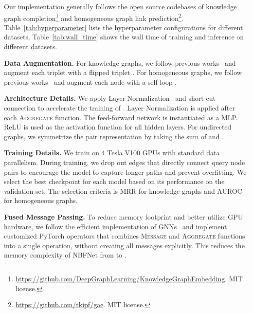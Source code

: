 Our implementation generally follows the open source codebases of knowledge graph completion\footnote{\url{https://github.com/DeepGraphLearning/KnowledgeGraphEmbedding}. MIT license.} and homogeneous graph link prediction\footnote{\url{https://github.com/tkipf/gae}. MIT license.}. Table~\ref{tab:hyperparameter} lists the hyperparameter configurations for different datasets. Table~\ref{tab:wall_time} shows the wall time of training and inference on different datasets.

\textbf{Data Augmentation.} For knowledge graphs, we follow previous works~\cite{yang2017differentiable, sadeghian2019drum} and augment each triplet  with a flipped triplet . For homogeneous graphs, we follow previous works~\cite{kipf2016semi, kipf2016variational} and augment each node  with a self loop .

\textbf{Architecture Details.} We apply Layer Normalization~\cite{ba2016layer} and short cut connection to accelerate the training of \method. Layer Normalization is applied after each \textsc{Aggregate} function. The feed-forward network  is instantiated as a MLP. ReLU is used as the activation function for all hidden layers. For undirected graphs, we symmetrize the pair representation by taking the sum of  and .

\textbf{Training Details.} We train \method on 4 Tesla V100 GPUs with standard data parallelism. During training, we drop out edges that directly connect query node pairs to encourage the model to capture longer paths and prevent overfitting. We select the best checkpoint for each model based on its performance on the validation set. The selection criteria is MRR for knowledge graphs and AUROC for homogeneous graphs.

\textbf{Fused Message Passing.} To reduce memory footprint and better utilize GPU hardware, we follow the efficient implementation of GNNs~\cite{huang2020ge} and implement customized PyTorch operators that combines \textsc{Message} and \textsc{Aggregate} functions into a single operation, without creating all messages explicitly. This reduces the memory complexity of NBFNet from  to .


